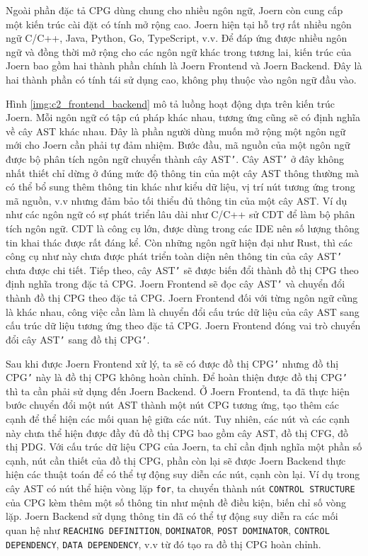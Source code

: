 Ngoài phần đặc tả CPG dùng chung cho nhiều ngôn ngữ, Joern còn cung cấp một kiến trúc cài đặt có tính mở rộng cao.
Joern hiện tại hỗ trợ rất nhiều ngôn ngữ C/C++, Java, Python, Go, TypeScript, v.v.
Để đáp ứng được nhiều ngôn ngữ và đồng thời mở rộng cho các ngôn ngữ khác trong tương lai, kiến trúc của Joern bao gồm hai thành phần chính là Joern Frontend và Joern Backend.
Đây là hai thành phần có tính tái sử dụng cao, không phụ thuộc vào ngôn ngữ đầu vào.

Hình \ref{img:c2_frontend_backend} mô tả luồng hoạt động dựa trên kiến trúc Joern.
Mỗi ngôn ngữ có tập cú pháp khác nhau, tương ứng cũng sẽ có định nghĩa về cây AST khác nhau.
Đây là phần người dùng muốn mở rộng một ngôn ngữ mới cho Joern cần phải tự đảm nhiệm.
Bước đầu, mã nguồn của một ngôn ngữ được bộ phân tích ngôn ngữ chuyển thành cây AST\texttt{'}.
Cây AST\texttt{'} ở đây không nhất thiết chỉ dừng ở đúng mức độ thông tin của một cây AST thông thường mà có thể bổ sung thêm thông tin khác như kiểu dữ liệu, vị trí nút tương ứng trong mã nguồn, v.v nhưng đảm bảo tối thiểu đủ thông tin của một cây AST.
Ví dụ như các ngôn ngữ có sự phát triển lâu dài như C/C++ sử CDT \cite{eclipseEclipseCC} để làm bộ phân tích ngôn ngữ.
CDT là công cụ lớn, được dùng trong các IDE nên số lượng thông tin khai thác được rất đáng kể.
Còn những ngôn ngữ hiện đại như Rust, thì các công cụ như này chưa được phát triển toàn diện nên thông tin của cây AST\texttt{'} chưa được chi tiết.
Tiếp theo, cây AST\texttt{'} sẽ được biến đổi thành đồ thị CPG theo định nghĩa trong đặc tả CPG.
Joern Frontend sẽ đọc cây AST\texttt{'} và chuyển đổi thành đồ thị CPG theo đặc tả CPG.
Joern Frontend đối với từng ngôn ngữ cũng là khác nhau, công việc cần làm là chuyển đổi cấu trúc dữ liệu của cây AST sang cấu trúc dữ liệu tương ứng theo đặc tả CPG.
Joern Frontend đóng vai trò chuyển đổi cây AST\texttt{'} sang đồ thị CPG\texttt{'}.

Sau khi được Joern Frontend xử lý, ta sẽ có được đồ thị CPG\texttt{'} nhưng đồ thị CPG\texttt{'} này là đồ thị CPG không hoàn chỉnh.
Để hoàn thiện được đồ thị CPG\texttt{'} thì ta cần phải sử dụng đến Joern Backend.
Ở Joern Frontend, ta đã thực hiện bước chuyển đổi một nút AST thành một nút CPG tương ứng, tạo thêm các cạnh để thể hiện các mối quan hệ giữa các nút.
Tuy nhiên, các nút và các cạnh này chưa thể hiện được đầy đủ đồ thị CPG bao gồm cây AST, đồ thị CFG, đồ thị PDG.
Với cấu trúc dữ liệu CPG của Joern, ta chỉ cần định nghĩa một phần số cạnh, nút cần thiết của đồ thị CPG, phần còn lại sẽ được Joern Backend thực hiện các thuật toán để có thể tự động suy diễn các nút, cạnh còn lại.
Ví dụ trong cây AST có nút thể hiện vòng lặp \texttt{for}, ta chuyển thành nút \texttt{CONTROL STRUCTURE} của CPG kèm thêm một số thông tin như mệnh đề điều kiện, biến chỉ số vòng lặp.
Joern Backend sử dụng thông tin đã có thể tự động suy diễn ra các mối quan hệ như \texttt{REACHING DEFINITION}, \texttt{DOMINATOR}, \texttt{POST DOMINATOR}, \texttt{CONTROL DEPENDENCY}, \texttt{DATA DEPENDENCY}, v.v từ đó tạo ra đồ thị CPG hoàn chỉnh.

